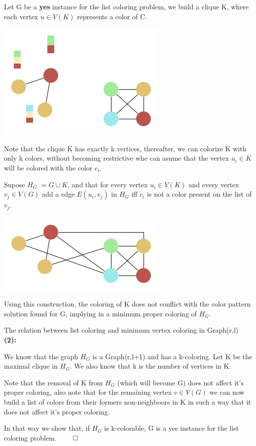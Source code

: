 \documentclass[9pt, compress]{beamer}
\begin{document}
    \begin{frame}
      Let G be a \textbf{yes} instance for the list coloring problem, we build a clique K, where each vertex $u \in V(K)$ represents a color of C.
      \begin{center}
        \includegraphics[scale=0.4]{../figuras/presentation-K.png}
      \end{center}
      Note that the clique K has exactly k vertices, thereafter, we can colorize K with only k colors, without becoming restrictive whe can asume that the vertex $u_i \in K$ will be colored with the color $c_i$.
    \end{frame}
    \begin{frame}  
      Supose $H_G$ $= G \cup K$, and that for every vertex $u_i \in V(K)$ and every vertex $v_j \in V(G)$ add a edge $E(u_i,v_j) $ in $H_G$ iff $c_i$ is not a color present on the list of $v_j$.
      \begin{center}
        \includegraphics[scale=0.4]{../figuras/presentation-H.png}
      \end{center}   
      Using this construction, the coloring of K does not conflict with the color pattern solution found for G, implying in a minimum proper coloring of $H_G$. 
    \end{frame}
    \begin{frame}{The relation between list coloring and minimum vertex coloring in Graph(r,l)}
      \textbf{(2):}
      
      We know that the graph $H_G$ is a Graph(r,l+1) and has a k-coloring. Let K be the maximal clique in $H_G$.
      We also know that k is the number of vertices in K.
      
      Note that the removal of K from $H_G$ (which will become G) does not affect it's proper coloring, also note that for the remaining vertex $v \in V(G)$ we can now build a list of colors from their formers non-neighboors in K in such a way that it does not affect it's proper coloring.
      
      In that way we show that, if $H_G$ is k-colorable, G is a yes instance for the list coloring problem.
      $\qed$
    \end{frame}
\end{document}
